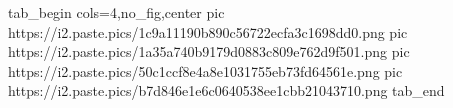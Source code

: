  
 
 
 
 
\zzSecCmtScr

\ifcmt
  tab_begin cols=4,no_fig,center
     pic https://i2.paste.pics/1c9a11190b890c56722ecfa3c1698dd0.png
		 pic https://i2.paste.pics/1a35a740b9179d0883c809e762d9f501.png
		 pic https://i2.paste.pics/50c1ccf8e4a8e1031755eb73fd64561e.png
		 pic https://i2.paste.pics/b7d846e1e6c0640538ee1cbb21043710.png
  tab_end
\fi
